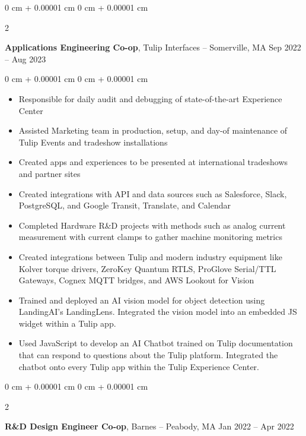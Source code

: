 \documentclass[10pt, letterpaper]{article}
\newenvironment{highlights}{
    \begin{itemize}[
        topsep=0.10 cm,
        parsep=0.10 cm,
        partopsep=0pt,
        itemsep=0pt,
        leftmargin=0 cm + 10pt
    ]
}{
    \end{itemize}
} %
\newenvironment{onecolentry}{
    \begin{adjustwidth}{
        0 cm + 0.00001 cm
    }{
        0 cm + 0.00001 cm
    }
}{
    \end{adjustwidth}
} %
\newenvironment{twocolentry}[2][]{
    \onecolentry
    \def\secondColumn{#2}
    \setcolumnwidth{\fill, 4.5 cm}
    \begin{paracol}{2}
}{
    \switchcolumn \raggedleft \secondColumn
    \end{paracol}
    \endonecolentry
} %
\begin{document}
        \vspace{0.2 cm}

	\begin{twocolentry}{
            Sep 2022 – Aug 2023
        }
            \textbf{Applications Engineering Co-op}, Tulip Interfaces -- Somerville, MA\end{twocolentry}

        \vspace{0.10 cm}
        \begin{onecolentry}
            \begin{highlights}
	     \item Responsible for daily audit and debugging of state-of-the-art Experience Center
	     \item Assisted Marketing team in production, setup, and day-of maintenance of Tulip Events and tradeshow installations
                \item Created apps and experiences to be presented at international tradeshows and partner sites
                \item Created integrations with API and data sources such as Salesforce, Slack, PostgreSQL, and Google Transit, Translate, and Calendar
                \item Completed Hardware R\&D projects with methods such as analog current measurement with current clamps to gather machine monitoring metrics
                \item Created integrations between Tulip and modern industry equipment like Kolver torque drivers, ZeroKey Quantum RTLS, ProGlove Serial/TTL Gateways, Cognex MQTT bridges, and AWS Lookout for Vision
                \item Trained and deployed an AI vision model for object detection using LandingAI’s LandingLens. Integrated the vision model into an embedded JS widget within a Tulip app.
                \item Used JavaScript to develop an AI Chatbot trained on Tulip documentation that can respond to questions about the Tulip platform. Integrated the chatbot onto every Tulip app within the Tulip Experience Center.
            \end{highlights}
        \end{onecolentry}


        \vspace{0.2 cm}

        \begin{twocolentry}{
            Jan 2022 – Apr 2022
        }
            \textbf{R\&D Design Engineer Co-op}, Barnes -- Peabody, MA\end{twocolentry}
\end{document}
